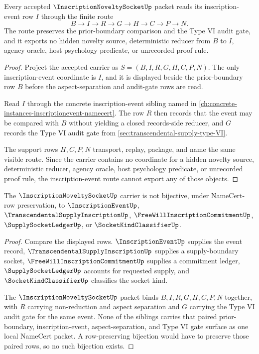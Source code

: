 \begin{theorem}
\label{thm:inscription-novelty-socket-inscription-event-route}
Every accepted $\InscriptionNoveltySocketUp$ packet reads its inscription-event row $I$ through the finite route
$$
B \to I \to R \to G \to H \to C \to P \to N.
$$
The route preserves the prior-boundary comparison and the Type VI audit gate, and it exports no hidden novelty source, deterministic reducer from $B$ to $I$, agency oracle, host psychology predicate, or unrecorded proof rule.
\end{theorem}
\begin{proof}
Project the accepted carrier as $S=(B,I,R,G,H,C,P,N)$. The only inscription-event coordinate is $I$, and it is displayed beside the prior-boundary row $B$ before the aspect-separation and audit-gate rows are read.

Read $I$ through the concrete inscription-event sibling named in \autoref{ch:concrete-instances-inscriptionevent-namecert}. The row $R$ then records that the event may be compared with $B$ without yielding a closed records-side reducer, and $G$ records the Type VI audit gate from \autoref{sec:transcendental-supply-type-VI}.

The support rows $H,C,P,N$ transport, replay, package, and name the same visible route. Since the carrier contains no coordinate for a hidden novelty source, deterministic reducer, agency oracle, host psychology predicate, or unrecorded proof rule, the inscription-event route cannot export any of those objects.
\end{proof}

\begin{theorem}
\label{thm:inscription-novelty-socket-sibling-independence}
The $\InscriptionNoveltySocketUp$ carrier is not bijective, under NameCert-row preservation, to $\InscriptionEventUp$, $\TranscendentalSupplyInscriptionUp$, $\FreeWillInscriptionCommitmentUp$, $\SupplySocketLedgerUp$, or $\SocketKindClassifierUp$.
\end{theorem}
\begin{proof}
Compare the displayed rows. $\InscriptionEventUp$ supplies the event record, $\TranscendentalSupplyInscriptionUp$ supplies a supply-boundary socket, $\FreeWillInscriptionCommitmentUp$ supplies a commitment ledger, $\SupplySocketLedgerUp$ accounts for requested supply, and $\SocketKindClassifierUp$ classifies the socket kind.

The $\InscriptionNoveltySocketUp$ packet binds $B,I,R,G,H,C,P,N$ together, with $R$ carrying non-reduction and aspect separation and $G$ carrying the Type VI audit gate for the same event. None of the siblings carries that paired prior-boundary, inscription-event, aspect-separation, and Type VI gate surface as one local NameCert packet. A row-preserving bijection would have to preserve those paired rows, so no such bijection exists.
\end{proof}

